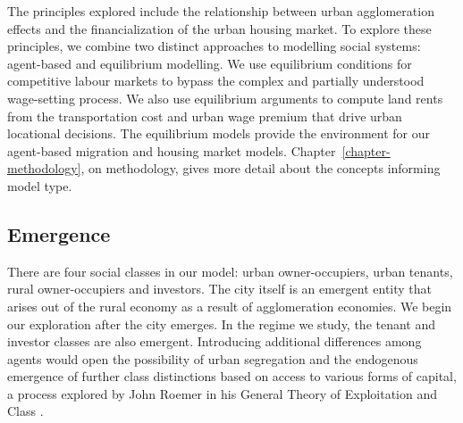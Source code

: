 The principles explored include the relationship between urban agglomeration effects and the financialization of the urban housing market. To explore these principles, we combine two distinct approaches to modelling social systems: agent-based and equilibrium modelling. We use equilibrium conditions for competitive labour markets to bypass the complex and partially understood wage-setting process. We also use equilibrium arguments to compute land rents from the transportation cost and urban wage premium that drive urban locational decisions. The equilibrium models provide the environment for our agent-based migration and housing market models. Chapter~\ref{chapter-methodology}, on methodology, gives more detail about the concepts informing model type. 

\subsection{Emergence}



There are four social classes in our model: urban owner-occupiers, urban tenants, rural owner-occupiers and investors. The city itself %
is an emergent entity that arises %
out of the rural economy as a result of agglomeration economies. We begin our exploration after the city emerges. In the regime we study, the tenant and investor classes are also emergent. Introducing additional differences among agents would open the possibility of urban segregation and the endogenous emergence of further \gls{class} distinctions based on access to various forms of capital, a process explored by John Roemer in his General Theory of Exploitation and Class \cite{roemerGeneralTheoryExploitation1982}.

